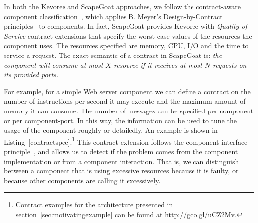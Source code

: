 In both the Kevoree and ScapeGoat approaches, we follow the contract-aware component classification~\cite{Beugnard:1999:MCC:619042.621275}, which applies B. Meyer's Design-by-Contract principles~\cite{Meyer:1992:ADC:618974.619797} to components.
In fact, ScapeGoat provides Kevoree with \textit{Quality of Service} contract extensions that specify the worst-case values of the resources the component uses.
The resources specified are memory, CPU, I/O and the time to service a request.
The exact semantic of a contract in ScapeGoat is: \textit{the component will consume at most $X$ resource if it receives at most $N$ requests on its provided ports.}  

For example, for a simple Web server component we can define a contract on the number of instructions per second it may execute \cite{Binder200645} and the maximum amount of memory it can consume.
The number of messages can be specified per component or per component-port.
In this way, the information can be used to tune the usage of the component roughly or detailedly.
An example is shown in Listing~\ref{contractspec}.\footnote{Contract examples for the architecture presented in section~\ref{sec:motivatingexample} can be found at \url{http://goo.gl/uCZ2Mv}.} This contract extension follows the component interface principle~\cite{Henzinger03}, and allows us to detect if the problem comes from the component implementation or from a component interaction.
That is, we can distinguish between a component that is using excessive resources because it is faulty, or because other components are calling it excessively.



